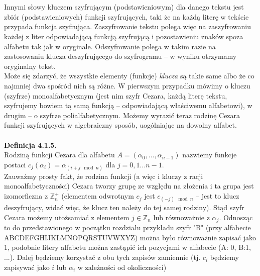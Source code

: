 \documentclass[a4paper]{article}
\begin{document}
\\\\
Innymi słowy kluczem szyfrującym (podstawieniowym) dla danego tekstu jest zbiór (podstawieniowych) funkcji szyfrujących, taki że na każdą literę w tekście przypada funkcja szyfrująca. Zaszyfrowanie tekstu polega więc na zaszyfrowaniu każdej z liter odpowiadającą funkcją szyfrującą i pozostawieniu znaków spoza alfabetu tak jak w oryginale. Odszyfrowanie polega w takim razie na zastosowaniu klucza deszyfrującego do szyfrogramu – w wyniku otrzymamy oryginalny tekst.\\
Może się zdarzyć, że wszystkie elementy (funkcje) \textit{klucza} są takie same albo że co najmniej dwa spośród nich są różne. W pierwszym przypadku mówimy o kluczu (szyfrze) monoalfabetycznym (jest nim szyfr Cezara, każdą literę tekstu, szyfrujemy bowiem tą samą funkcją – odpowiadającą właściwemu alfabetowi), w drugim – o szyfrze polialfabetycznym.
Możemy wyrazić teraz rodzinę Cezara funkcji szyfrujących w algebraiczny sposób, uogólniając na dowolny alfabet.\\\\
\textbf{Definicja 4.1.5.}\\
Rodziną funkcji Cezara dla alfabetu $A = (\alpha_0, ..., \alpha_{n-1})$ nazwiemy funkcje postaci $c_j(\alpha_i) = \alpha_{(i+j \mod n)}$ dla $j = 0,1...n-1$.\\
Zauważmy prosty fakt, że rodzina funkcji (a więc i kluczy z racji monoalfabetyczności) Cezara tworzy grupę ze względu na złożenia i ta grupa jest izomorficzna z $\mathbb{Z}_n^+$ (elementem odwrotnym $c_{j}$ jest $c_{(-j) \mod n}$ – jest to klucz deszyfrujący, widać więc, że klucz ten należy do tej samej rodziny). Stąd szyfr Cezara możemy utożsamiać z elementem $j \in \mathbb{Z}_n$ lub równoważnie z $\alpha_j$. Odnosząc to do przedstawionego w początku rozdziału przykładu szyfr "B" (przy alfabecie ABCDEFGHIJKLMNOPQRSTUVWXYZ) można było równoważnie zapisać jako 1, podobnie litery alfabetu można zastąpić ich pozycjami w alfabecie (A: 0, B:1, ...).  Dalej będziemy korzystać z obu tych zapisów zamiennie (tj. $c_i$ będziemy zapisywać jako $i$ lub $\alpha_i$ w zależności od okoliczności)\\
\end{document}
